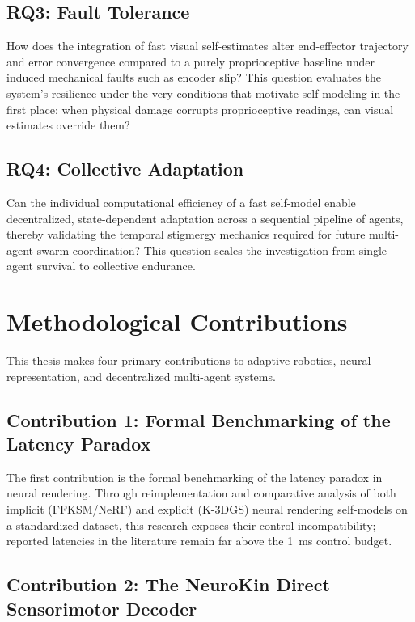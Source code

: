 \documentclass[12pt,a4paper,oneside]{report}
\begin{document}
\subsection{RQ3: Fault Tolerance}
\label{subsec:rq3}

How does the integration of fast visual self-estimates alter end-effector trajectory and error convergence compared to a purely proprioceptive baseline under induced mechanical faults such as encoder slip? This question evaluates the system's resilience under the very conditions that motivate self-modeling in the first place: when physical damage corrupts proprioceptive readings, can visual estimates override them?
\subsection{RQ4: Collective Adaptation}
\label{subsec:rq4}

Can the individual computational efficiency of a fast self-model enable decentralized, state-dependent adaptation across a sequential pipeline of agents, thereby validating the temporal stigmergy mechanics required for future multi-agent swarm coordination? This question scales the investigation from single-agent survival to collective endurance.
\section{Methodological Contributions}
\label{sec:methodological_contributions}

This thesis makes four primary contributions to adaptive robotics, neural representation, and decentralized multi-agent systems.
\subsection{Contribution 1: Formal Benchmarking of the Latency Paradox}
\label{subsec:contrib_benchmarking}

The first contribution is the formal benchmarking of the latency paradox in neural rendering. Through reimplementation and comparative analysis of both implicit (FFKSM/NeRF) and explicit (K-3DGS) neural rendering self-models on a standardized dataset, this research exposes their control incompatibility; reported latencies in the literature remain far above the 1~ms control budget.
\subsection{Contribution 2: The NeuroKin Direct Sensorimotor Decoder}
\label{subsec:contrib_neurokin}
\end{document}
